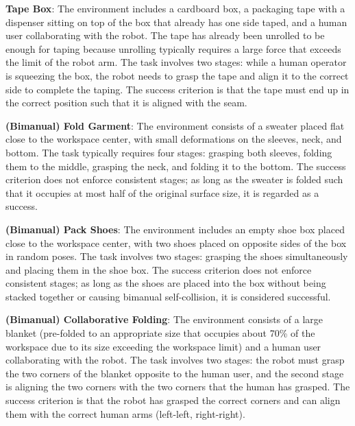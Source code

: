 \textbf{Tape Box}: The environment includes a cardboard box, a packaging tape with a dispenser sitting on top of the box that already has one side taped, and a human user collaborating with the robot. The tape has already been unrolled to be enough for taping because unrolling typically requires a large force that exceeds the limit of the robot arm. The task involves two stages: while a human operator is squeezing the box, the robot needs to grasp the tape and align it to the correct side to complete the taping. The success criterion is that the tape must end up in the correct position such that it is aligned with the seam.

\textbf{(Bimanual) Fold Garment}: The environment consists of a sweater placed flat close to the workspace center, with small deformations on the sleeves, neck, and bottom. The task typically requires four stages: grasping both sleeves, folding them to the middle, grasping the neck, and folding it to the bottom. The success criterion does not enforce consistent stages; as long as the sweater is folded such that it occupies at most half of the original surface size, it is regarded as a success.

\textbf{(Bimanual) Pack Shoes}: The environment includes an empty shoe box placed close to the workspace center, with two shoes placed on opposite sides of the box in random poses. The task involves two stages: grasping the shoes simultaneously and placing them in the shoe box. The success criterion does not enforce consistent stages; as long as the shoes are placed into the box without being stacked together or causing bimanual self-collision, it is considered successful.

\textbf{(Bimanual) Collaborative Folding}: The environment consists of a large blanket (pre-folded to an appropriate size that occupies about 70\% of the workspace due to its size exceeding the workspace limit) and a human user collaborating with the robot. The task involves two stages: the robot must grasp the two corners of the blanket opposite to the human user, and the second stage is aligning the two corners with the two corners that the human has grasped. The success criterion is that the robot has grasped the correct corners and can align them with the correct human arms (left-left, right-right).

